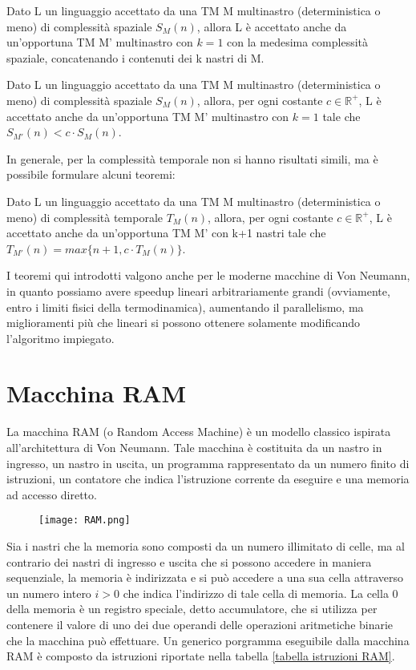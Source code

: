   \begin{theorem}
    Dato L un linguaggio accettato da una TM M multinastro (deterministica o meno) di complessità spaziale \({S}_M(n)\), allora L è accettato anche da un'opportuna TM M' multinastro con \(k=1\) con la medesima complessità spaziale, concatenando i contenuti dei k nastri di M.
  \end{theorem}

  \begin{theorem}
    Dato L un linguaggio accettato da una TM M multinastro (deterministica o meno) di complessità spaziale \({S}_M(n)\), allora, per ogni costante \(c\in \mathbb{R}^+\), L è accettato anche da un'opportuna TM M' multinastro con \(k=1\) tale che \({S}_{M'}(n)<c\cdot{S}_M(n)\).
  \end{theorem}

  In generale, per la complessità temporale non si hanno risultati simili, ma è possibile formulare alcuni teoremi:

  \begin{theorem}
    Dato L un linguaggio accettato da una TM M multinastro (deterministica o meno) di complessità temporale \({T}_M(n)\), allora, per ogni costante \(c\in \mathbb{R}^+\), L è accettato anche da un'opportuna TM M' con k+1 nastri tale che \({T}_{M'}(n) = max\{n+1, c\cdot{T}_M(n)\}\).    
  \end{theorem}

  I teoremi qui introdotti valgono anche per le moderne macchine di Von Neumann, in quanto possiamo avere speedup lineari arbitrariamente grandi (ovviamente, entro i limiti fisici della termodinamica), aumentando il parallelismo, ma miglioramenti più che lineari si possono ottenere solamente modificando l'algoritmo impiegato. 

  \section{Macchina RAM}
  La macchina RAM (o Random Access Machine) è un modello classico ispirata all'architettura di Von Neumann. Tale macchina è costituita da un nastro in ingresso, un nastro in uscita, un programma rappresentato da un numero finito di istruzioni, un contatore che indica l'istruzione corrente da eseguire e una memoria ad accesso diretto.

  \begin{figure}[h]
    \texttt{[image: RAM.png]}
  \end{figure}

  Sia i nastri che la memoria sono composti da un numero illimitato di celle, ma al contrario dei nastri di ingresso e uscita che si possono accedere in maniera sequenziale, la memoria è indirizzata e si può accedere a una sua cella attraverso un numero intero \(i>0\) che indica l'indirizzo di tale cella di memoria. La cella 0 della memoria è un registro speciale, detto accumulatore, che si utilizza per contenere il valore di uno dei due operandi delle operazioni aritmetiche binarie che la macchina può effettuare. Un generico porgramma eseguibile dalla macchina RAM è composto da istruzioni riportate nella tabella \ref{tabella istruzioni RAM}.

